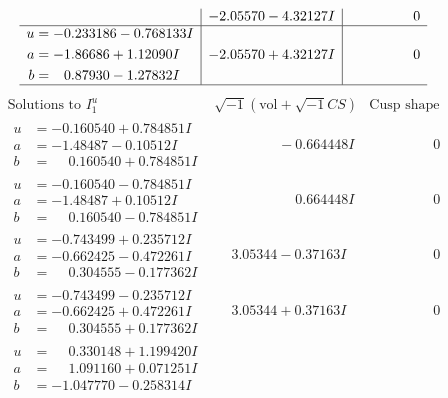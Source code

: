 \documentclass[1p]{elsarticle_modified}
\theoremstyle{definition}
\newcommand{\I}{\sqrt{-1}}
\begin{document}
$$\begin{array}{c|c|c}
 & -2.05570 - 4.32127 I & \phantom{-0.000000 } 0 \\ \hline\begin{aligned}
u &= -0.233186 - 0.768133 I \\
a &= -1.86686 + 1.12090 I \\
b &= \phantom{-}0.87930 - 1.27832 I\end{aligned}
 & -2.05570 + 4.32127 I & \phantom{-0.000000 } 0\\
 \hline 
 \end{array}$$\newpage$$\begin{array}{c|c|c}  
\text{Solutions to }I^u_{1}& \I (\text{vol} + \sqrt{-1}CS) & \text{Cusp shape}\\
 \hline 
\begin{aligned}
u &= -0.160540 + 0.784851 I \\
a &= -1.48487 - 0.10512 I \\
b &= \phantom{-}0.160540 + 0.784851 I\end{aligned}
 & \phantom{-0.000000 } -0.664448 I & \phantom{-0.000000 } 0 \\ \hline\begin{aligned}
u &= -0.160540 - 0.784851 I \\
a &= -1.48487 + 0.10512 I \\
b &= \phantom{-}0.160540 - 0.784851 I\end{aligned}
 & \phantom{-0.000000 -}0.664448 I & \phantom{-0.000000 } 0 \\ \hline\begin{aligned}
u &= -0.743499 + 0.235712 I \\
a &= -0.662425 - 0.472261 I \\
b &= \phantom{-}0.304555 - 0.177362 I\end{aligned}
 & \phantom{-}3.05344 - 0.37163 I & \phantom{-0.000000 } 0 \\ \hline\begin{aligned}
u &= -0.743499 - 0.235712 I \\
a &= -0.662425 + 0.472261 I \\
b &= \phantom{-}0.304555 + 0.177362 I\end{aligned}
 & \phantom{-}3.05344 + 0.37163 I & \phantom{-0.000000 } 0 \\ \hline\begin{aligned}
u &= \phantom{-}0.330148 + 1.199420 I \\
a &= \phantom{-}1.091160 + 0.071251 I \\
b &= -1.047770 - 0.258314 I\end{aligned}

\end{array}$$
\end{document}
